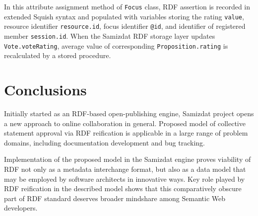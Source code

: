 \documentclass{llncs}
\begin{document}
In this attribute assignment method of {\tt Focus} class, RDF assertion is
recorded in extended Squish syntax and populated with variables storing the
rating {\tt value}, resource identifier {\tt resource.id}, focus identifier
{\tt @id}, and identifier of registered member {\tt session.id}. When the
Samizdat RDF storage layer updates {\tt Vote.voteRating}, average value of
corresponding {\tt Proposition.rating} is recalculated by a stored procedure.


\section{Conclusions}

Initially started as an RDF-based open-publishing engine, Samizdat project
opens a new approach to online collaboration in general. Proposed model of
collective statement approval via RDF reification is applicable in a large
range of problem domains, including documentation development and bug
tracking.

Implementation of the proposed model in the Samizdat engine proves viability
of RDF not only as a metadata interchange format, but also as a data model
that may be employed by software architects in innovative ways. Key role
played by RDF reification in the described model shows that this comparatively
obscure part of RDF standard deserves broader mindshare among Semantic Web
developers.
\end{document}
